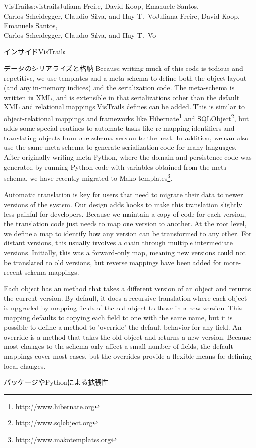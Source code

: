 \begin{aosachaptertoc}{VisTrails}{s:vistrails}{Juliana Freire, David Koop, Emanuele Santos, \\ Carlos Scheidegger, Claudio Silva, and Huy T.\ Vo}{Juliana Freire, David Koop, Emanuele Santos, \\ \hspace*{0.9cm} Carlos Scheidegger, Claudio Silva, and Huy T.\ Vo}
\begin{aosasect1}{インサイドVisTrails}
\begin{aosasect2}{データのシリアライズと格納}
Because writing much of this code is tedious and repetitive, we use
templates and a meta-schema to define both the object layout (and any
in-memory indices) and the serialization code.  The meta-schema is
written in XML, and is extensible in that serializations other than
the default XML and relational mappings VisTrails defines can be
added.  This is similar to object-relational mappings and frameworks
like Hibernate\footnote{\url{http://www.hibernate.org}} and
SQLObject\footnote{\url{http://www.sqlobject.org}}, but adds some
special routines to automate tasks like re-mapping identifiers and
translating objects from one schema version to the next.  In addition,
we can also use the same meta-schema to generate serialization code
for many languages.  After originally writing meta-Python, where the
domain and persistence code was generated by running Python code with
variables obtained from the meta-schema, we have recently migrated to
Mako templates\footnote{\url{http://www.makotemplates.org}}.

Automatic translation is key for users that need to migrate their data
to newer versions of the system.  Our design adds hooks to make this
translation slightly less painful for developers.  Because we maintain
a copy of code for each version, the translation code just needs to
map one version to another.  At the root level, we define a map to
identify how any version can be transformed to any other.  For distant
versions, this usually involves a chain through multiple intermediate
versions.  Initially, this was a forward-only map, meaning new
versions could not be translated to old versions, but reverse mappings
have been added for more-recent schema mappings.

Each object has an  method that takes a different
version of an object and returns the current version.  By default, it
does a recursive translation where each object is upgraded by mapping
fields of the old object to those in a new version.  This mapping
defaults to copying each field to one with the same name, but it is
possible to define a method to "override" the default behavior for any
field.  An override is a method that takes the old object and returns
a new version.  Because most changes to the schema only affect a small
number of fields, the default mappings cover most cases, but the
overrides provide a flexible means for defining local changes.

\end{aosasect2}

\begin{aosasect2}{パッケージやPythonによる拡張性}
\label{sec.vistrails.packages}


\end{aosasect2}
\end{aosasect1}
\end{aosachaptertoc}
